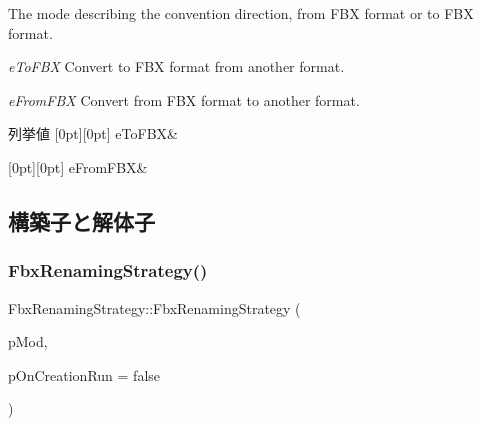 The mode describing the convention direction, from F\+BX format or to F\+BX format.
\begin{DoxyItemize}
\item {\itshape e\+To\+F\+BX} Convert to F\+BX format from another format.
\item {\itshape e\+From\+F\+BX} Convert from F\+BX format to another format. 
\end{DoxyItemize}\begin{DoxyEnumFields}{列挙値}
[0pt][0pt]{}\mbox{\label{class_fbx_renaming_strategy_a68099d97d087f66edd2ea873e0dbf423a5090bf661dd42c70207cef715cbcee56}} 
e\+To\+F\+BX&\\
\hline

[0pt][0pt]{}\mbox{\label{class_fbx_renaming_strategy_a68099d97d087f66edd2ea873e0dbf423aa816a2056da21a8dedcffd502248d854}} 
e\+From\+F\+BX&\\
\hline

\end{DoxyEnumFields}


\subsection{構築子と解体子}
\mbox{\label{class_fbx_renaming_strategy_a9412da6dd0bb77ed4597b114173d5385}} 
\subsubsection{\texorpdfstring{Fbx\+Renaming\+Strategy()}{FbxRenamingStrategy()}}
{\footnotesize\ttfamily Fbx\+Renaming\+Strategy\+::\+Fbx\+Renaming\+Strategy (\begin{DoxyParamCaption}\item[{\hyperlink{class_fbx_renaming_strategy_a68099d97d087f66edd2ea873e0dbf423}{E\+Direction}}]{p\+Mod,  }\item[{bool}]{p\+On\+Creation\+Run = {\ttfamily false} }\end{DoxyParamCaption})}

